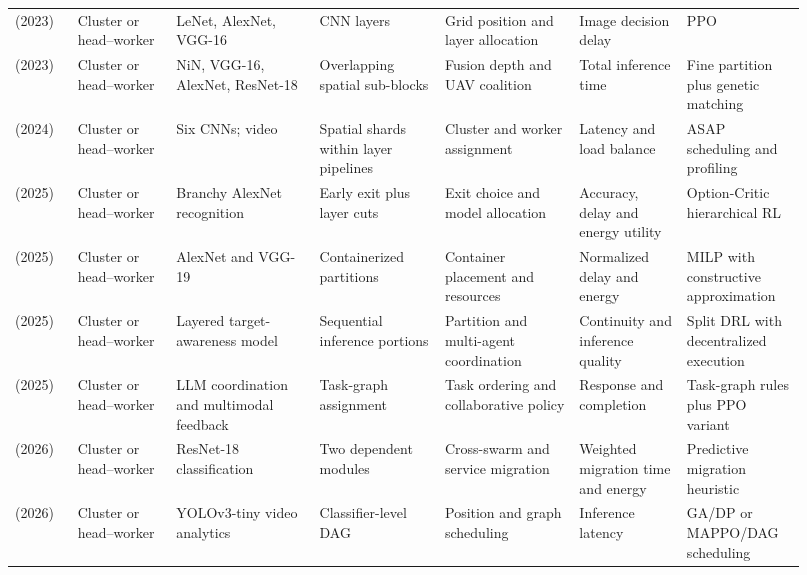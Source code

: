 \begin{longtable}{@{}Y{0.075\linewidth}Y{0.111\linewidth}Y{0.169\linewidth}Y{0.145\linewidth}Y{0.151\linewidth}Y{0.125\linewidth}Y{0.139\linewidth}@{}}
\cite{R0019}\newline\mbox{(2023)} & Cluster or head--worker & LeNet, AlexNet, VGG-16 & CNN layers & Grid position and layer allocation & Image decision delay & PPO \\
\cite{R0043}\newline\mbox{(2023)} & Cluster or head--worker & NiN, VGG-16, AlexNet, ResNet-18 & Overlapping spatial sub-blocks & Fusion depth and UAV coalition & Total inference time & Fine partition plus genetic matching \\
\cite{R0014}\newline\mbox{(2024)} & Cluster or head--worker & Six CNNs; video & Spatial shards within layer pipelines & Cluster and worker assignment & Latency and load balance & ASAP scheduling and profiling \\
\cite{R0022}\newline\mbox{(2025)} & Cluster or head--worker & Branchy AlexNet recognition & Early exit plus layer cuts & Exit choice and model allocation & Accuracy, delay and energy utility & Option-Critic hierarchical RL \\
\cite{R0083}\newline\mbox{(2025)} & Cluster or head--worker & AlexNet and VGG-19 & Containerized partitions & Container placement and resources & Normalized delay and energy & MILP with constructive approximation \\
\cite{R0106}\newline\mbox{(2025)} & Cluster or head--worker & Layered target-awareness model & Sequential inference portions & Partition and multi-agent coordination & Continuity and inference quality & Split DRL with decentralized execution \\
\cite{R0223}\newline\mbox{(2025)} & Cluster or head--worker & LLM coordination and multimodal feedback & Task-graph assignment & Task ordering and collaborative policy & Response and completion & Task-graph rules plus PPO variant \\
\cite{R0002}\newline\mbox{(2026)} & Cluster or head--worker & ResNet-18 classification & Two dependent modules & Cross-swarm and service migration & Weighted migration time and energy & Predictive migration heuristic \\
\cite{R0048}\newline\mbox{(2026)} & Cluster or head--worker & YOLOv3-tiny video analytics & Classifier-level DAG & Position and graph scheduling & Inference latency & GA\allowbreak{}/DP or MAPPO\allowbreak{}/DAG scheduling \\

\end{longtable}
